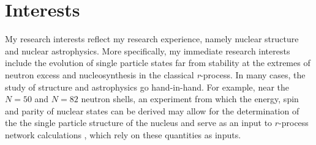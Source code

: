 {%
\section*{Interests}
My research interests reflect my research experience, namely nuclear structure and nuclear astrophysics.  More specifically, my immediate 
research interests include %
 the evolution of single particle states far from stability at the extremes of neutron excess and nucleosynthesis in the classical \textit{r}-process. %
 In many cases, the study of structure
and astrophysics go hand-in-hand. For example, %
near the $N=50$ and $N=82$ neutron shells,  
an experiment from which 
the energy, spin and parity of nuclear states can be derived may allow for the determination of the 
the single particle structure of the nucleus and serve as an input to 
$r$-process%
network calculations 
, which
 rely on these quantities as inputs. %

}
